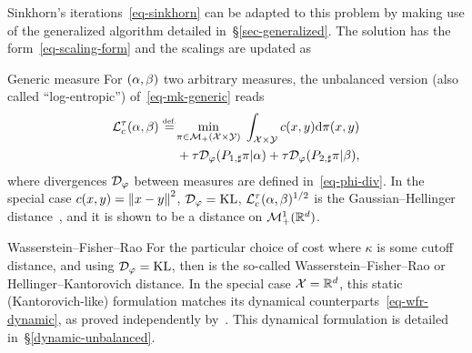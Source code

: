Sinkhorn's iterations~\eqref{eq-sinkhorn} can be adapted to this problem by making use of the generalized algorithm detailed in~\S\ref{sec-generalized}. The solution has the form~\eqref{eq-scaling-form} and the scalings are updated as

\begin{rem2}{Generic measure}
For $(\alpha,\beta)$ two arbitrary measures, the unbalanced version (also called ``log-entropic'') of~\eqref{eq-mk-generic} reads
\begin{align*}
	\MK_\c^\tau(\al,\be) \eqdef 
	&\umin{\pi \in \Mm_+(\X \times \Y)}
		\int_{\X \times \Y} \c(x,y) \d\pi(x,y) \\
		&+ \tau \Divergm_\phi(P_{1,\sharp}\pi|\al)
		+ \tau \Divergm_\phi(P_{2,\sharp}\pi|\be),
\end{align*}
where divergences $\mathcal{D}_\varphi$ between measures are defined in~\eqref{eq-phi-div}.
%
In the special case $c(x,y) = \left\| x-y \right\|^2$, $\mathcal{D}_\varphi=\operatorname{KL}$, $\mathcal{L}_c^\tau(\alpha,\beta)^{1/2}$ is the Gaussian--Hellinger distance~\citep{LieroMielkeSavareLong}, and it is shown to be a distance on $\mathcal{M}_+^1(\mathbb{R}^d)$. 
\end{rem2}

\begin{rem2}{Wasserstein--Fisher--Rao}\label{rem-wfr-static}
For the particular choice of cost
where $\kappa$ is some cutoff distance, and using $\mathcal{D}_\varphi=\operatorname{KL}$, then
is the so-called Wasserstein--Fisher--Rao or Hellinger--Kantorovich distance. 
%
In the special case $\mathcal{X}=\mathbb{R}^d$, this static (Kantorovich-like) formulation matches its dynamical counterparts~\eqref{eq-wfr-dynamic}, as proved independently by~\citet{LieroMielkeSavareLong,2015-chizat-unbalanced}. This dynamical formulation is detailed in~\S\ref{dynamic-unbalanced}.
%
\end{rem2}


